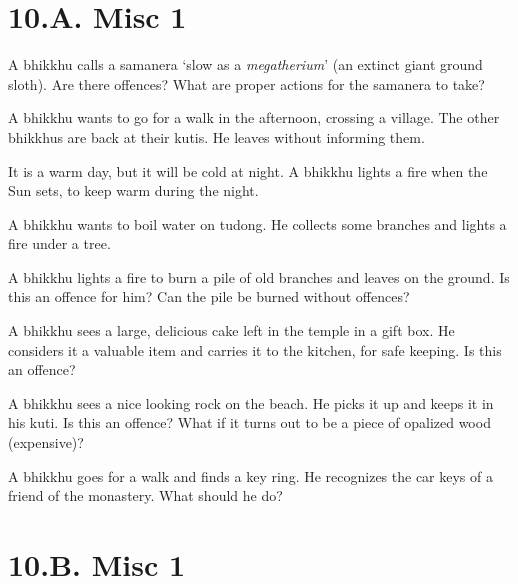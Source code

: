 \chapter{10.A. Misc 1}
\renewcommand*{\theChapterTitle}{10.A. Misc 1}

A bhikkhu calls a samanera `slow as a \emph{megatherium}' (an extinct giant ground sloth).
Are there offences?
What are proper actions for the samanera to take?

\bigskip

A bhikkhu wants to go for a walk in the afternoon, crossing a village. The other bhikkhus are back at their kutis.
He leaves without informing them.

\bigskip

It is a warm day, but it will be cold at night. A bhikkhu lights a fire when the Sun sets, to keep warm during the night.

\bigskip

A bhikkhu wants to boil water on tudong. He collects some branches and lights a fire under a tree.

\bigskip

A bhikkhu lights a fire to burn a pile of old branches and leaves on the ground.
Is this an offence for him?
Can the pile be burned without offences?

\bigskip

A bhikkhu sees a large, delicious cake left in the temple in a gift box.
He considers it a valuable item and carries it to the kitchen, for safe keeping.
Is this an offence?

\bigskip

A bhikkhu sees a nice looking rock on the beach.
He picks it up and keeps it in his kuti.
Is this an offence?
What if it turns out to be a piece of opalized wood (expensive)?

\bigskip

A bhikkhu goes for a walk and finds a key ring.
He recognizes the car keys of a friend of the monastery.
What should he do?

\chapter{10.B. Misc 1}
\renewcommand*{\theChapterTitle}{10.B. Misc 1}
